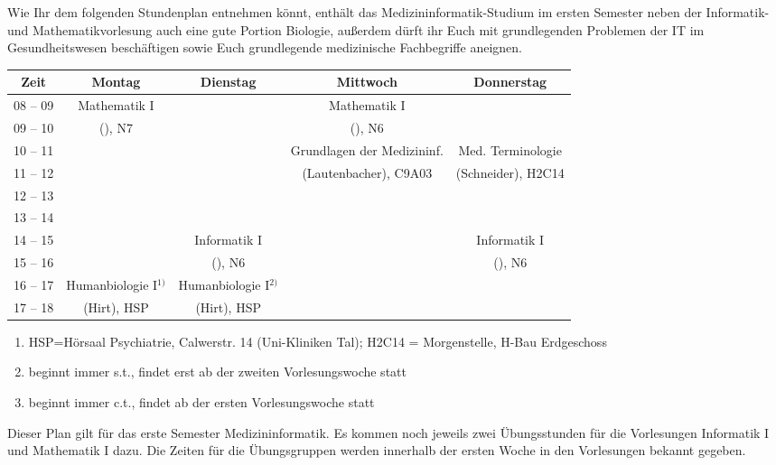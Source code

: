 Wie Ihr dem folgenden Stundenplan entnehmen könnt, enthält das Medizininformatik-Studium im ersten Semester neben der Informatik- und Mathematikvorlesung auch eine gute Portion Biologie, außerdem dürft ihr Euch mit grundlegenden Problemen der IT im Gesundheitswesen beschäftigen sowie Euch grundlegende medizinische Fachbegriffe aneignen.

\begin{center}
	\begin{tabular}{|c|c|c|c|c|} \hline
		Zeit      & 			Montag 		& Dienstag			& Mittwoch 						& Donnerstag 			 \\
		\hline\hline
		08 -- 09  & 		Mathematik I 	&  					& Mathematik I 					&  						\\
		\cline{1-1}\cline{3-3}\cline{5-5}			
		09 -- 10  & 		(\Matheprof), N7& 					& (\Matheprof), N6 				 &  						\\
		\hline
		10 -- 11  &							&					& Grundlagen der Medizininf.	& Med. Terminologie		\\
		\cline{1-3}
		11 -- 12  & 						&  					& (Lautenbacher), C9A03			&(Schneider), H2C14		\\
		\hline
		12 -- 13 & 							& 				 	& 				    			& 						 \\
		\hline
		13 -- 14 & 							& 					& 								& 						 \\
		\hline
		14 -- 15 & 							& Informatik I 		& 								& Informatik I 			\\
		\cline{1-2}\cline{4-4}
		15 -- 16 &							& (\Infoprof), N6 	& 								& (\Infoprof), N6 		\\
		\hline
		16 -- 17 & Humanbiologie I$^{1)}$	& Humanbiologie I$^{2)}$ & & \\
		\cline{1-1}\cline{4-5}
		17 -- 18 & (Hirt), HSP				& (Hirt), HSP		 & &  \\
		\hline
	\end{tabular}
\scriptsize
		
 \begin{enumerate}
 	\item[] HSP=Hörsaal Psychiatrie, Calwerstr. 14 (Uni-Kliniken Tal); H2C14 = Morgenstelle, H-Bau Erdgeschoss
	\item[1)] beginnt immer s.t., findet erst ab der zweiten Vorlesungswoche statt
	\item[2)] beginnt immer c.t., findet ab der ersten Vorlesungswoche statt
\end{enumerate}
\end{center}

Dieser Plan gilt für das erste Semester Medizininformatik. Es kommen noch jeweils zwei Übungsstunden für die Vorlesungen 
Informatik I und Mathematik I dazu. Die Zeiten für die Übungsgruppen werden innerhalb der ersten Woche in den Vorlesungen bekannt gegeben.

